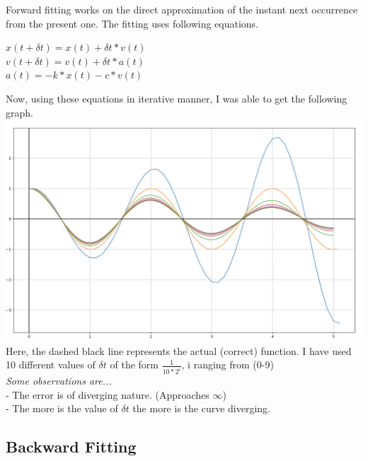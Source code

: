 \documentclass{article}
\begin{document}
        Forward fitting works on the direct approximation of the instant next occurrence from the present one. The fitting uses following equations.
                \begin{center}
                \(x(t+\delta t) = x(t) + \delta t*v(t)\) \\
                \(v(t+\delta t) = v(t) + \delta t*a(t)\) \\
                \(a(t) = - k*x(t) - c*v(t)\) \\
                \end{center}
        Now, using these equations in iterative manner, I was able to get the following graph. \\
        \includegraphics[scale=.25]{../Forward.png} \\
        Here, the dashed black line represents the actual (correct) function. I have used 10 different values of \(\delta t\) of the form \(\frac{1}{10 * 2^i}\), i ranging from (0-9) \\[20pt]
        \textit{Some observations are...} \\
             - The error is of diverging nature. (Approaches \(\infty\)) \\
             - The more is the value of \(\delta t\) the more is the curve diverging.
    
        \pagebreak
        \subsection*{Backward Fitting}
    
\end{document}
